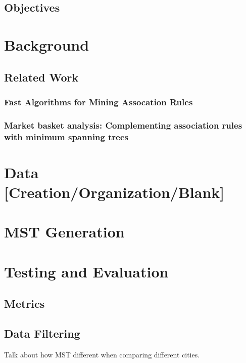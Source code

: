 \documentclass[paper=a4,fontsize=11pt]{article}	%
\begin{document}
\subsection{Objectives}



\section{Background}
\subsection{Related Work}
\subsubsection{Fast Algorithms for Mining Assocation Rules}
\subsubsection{Market basket analysis: Complementing association rules with minimum spanning trees}
\label{sec:mst paper}

\section{Data [Creation/Organization/Blank]}

\section{MST Generation}

\section{Testing and Evaluation}
\subsection{Metrics}
\subsection{Data Filtering}
Talk about how MST different when comparing different cities.

\printbibliography[heading=bibintoc]

\end{document}
